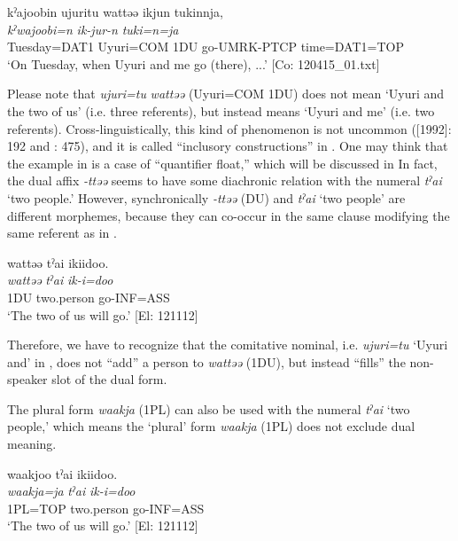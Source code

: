 \glll  kˀajoobin  ujuritu  wattəə  ikjun  tukinnja,\\
\textit{kˀwajoobi}\footnotemark\textit{=n}  \textit{}  \textit{}  \textit{ik-jur-n}  \textit{tuki=n=ja}\\
Tuesday=DAT1  Uyuri=COM  1DU  go-UMRK-PTCP  time=DAT1=TOP\\
\glt ‘On Tuesday, when Uyuri and me go (there), ...’ [Co: 120415\_01.txt]
\z
{}

Please note that \textit{ujuri=tu} \textit{wattəə} (Uyuri=COM 1DU) does not mean ‘Uyuri and the two of us’ (i.e. three referents), but instead means ‘Uyuri and me’ (i.e. two referents). Cross-linguistically, this kind of phenomenon is not uncommon (\citealt{Jespersen1924}[1992]: 192 and \citealt{Moravcsik2003}: 475), and it is called “inclusory constructions” in \citet{Lichtenberk2000}. One may think that the example in  is a case of “quantifier float,” which will be discussed in  In fact, the dual affix \textit{{}-ttəə} seems to have some diachronic relation with the numeral \textit{tˀai} ‘two people.’ However, synchronically \textit{{}-ttəə} (DU) and \textit{tˀai} ‘two people’ are different morphemes, because they can co-occur in the same clause modifying the same referent as in .

\ea \label{ex:5:5}   %
\glll  wattəə  tˀai  ikiidoo.\\
\textit{wattəə}  \textit{tˀai}  \textit{ik-i=doo}\\
1DU  two.person  go-INF=ASS\\
\glt ‘The two of us will go.’ [El: 121112]
\z

Therefore, we have to recognize that the comitative nominal, i.e. \textit{ujuri=tu} ‘Uyuri and’ in , does not “add” a person to \textit{wattəə} (1DU), but instead “fills” the non-speaker slot of the dual form.

The plural form \textit{waakja} (1PL) can also be used with the numeral \textit{tˀai} ‘two people,’ which means the ‘plural’ form \textit{waakja} (1PL) does not exclude dual meaning.

\ea \label{ex:5:6}   %
\glll  waakjoo  tˀai  ikiidoo.\\
\textit{waakja=ja}  \textit{tˀai}  \textit{ik-i=doo}\\
1PL=TOP  two.person  go-INF=ASS\\
\glt ‘The two of us will go.’ [El: 121112]
\z

